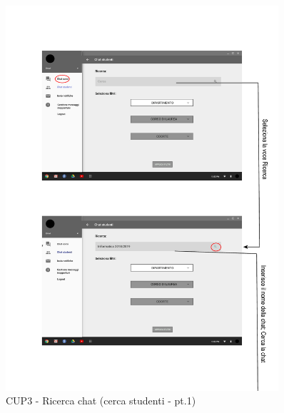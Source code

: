\begin{figure}
	\centering
	\includegraphics[width=0.9\textwidth]{imgs/gruppo6/activities/act_cup3_ricerca_chat_studenti.pdf}
	\caption{CUP3 - Ricerca chat (cerca studenti - pt.1)}
	\label{fig:act-cup3-7}
\end{figure}


